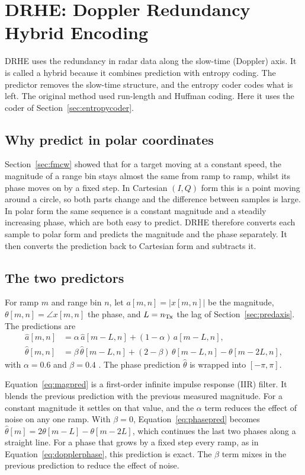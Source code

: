 \section{DRHE: Doppler Redundancy Hybrid Encoding}
\label{sec:drhe}

DRHE \cite{li2014,zivkovic2015} uses the redundancy in radar data along the
slow-time (Doppler) axis. It is called a hybrid because it combines prediction
with entropy coding. The predictor removes the slow-time structure, and the
entropy coder codes what is left. The original method used run-length and
Huffman coding. Here it uses the coder of Section~\ref{sec:entropycoder}.

\subsection{Why predict in polar coordinates}

Section~\ref{sec:fmcw} showed that for a target moving at a constant speed, the
magnitude of a range bin stays almost the same from ramp to ramp, whilst its
phase moves on by a fixed step. In Cartesian $(I,Q)$ form this is a point
moving around a circle, so both parts change and the difference between
samples is large. In polar form the same sequence is a constant magnitude and a
steadily increasing phase, which are both easy to predict. DRHE therefore
converts each sample to polar form and predicts the magnitude and the phase
separately. It then converts the prediction back to Cartesian form and
subtracts it.

\subsection{The two predictors}

For ramp $m$ and range bin $n$, let $a[m,n] = |x[m,n]|$ be the magnitude,
$\theta[m,n] = \angle x[m,n]$ the phase, and $L = n_{\mathrm{Tx}}$ the lag of
Section~\ref{sec:predaxis}. The predictions are
\begin{align}
\label{eq:magpred}
\hat{a}[m,n] &= \alpha\,\hat{a}[m-L,n] + (1-\alpha)\,a[m-L,n],\\[3pt]
\label{eq:phasepred}
\hat{\theta}[m,n] &= \beta\,\hat{\theta}[m-L,n]
   + (2-\beta)\,\theta[m-L,n] - \theta[m-2L,n],
\end{align}
with $\alpha = 0.6$ and $\beta = 0.4$ \cite[Table~4.4]{kiem2025}. The phase
prediction $\hat{\theta}$ is wrapped into $[-\pi, \pi]$.

Equation~\eqref{eq:magpred} is a first-order infinite impulse response (IIR)
filter. It blends the previous prediction with the previous measured
magnitude. For a constant magnitude it settles on that value, and the $\alpha$
term reduces the effect of noise on any one ramp. With $\beta = 0$,
Equation~\eqref{eq:phasepred} becomes
$\hat{\theta}[m] = 2\theta[m-L] - \theta[m-2L]$, which continues the last two
phases along a straight line. For a phase that grows by a fixed step every
ramp, as in Equation~\eqref{eq:dopplerphase}, this prediction is exact. The
$\beta$ term mixes in the previous prediction to reduce the effect of noise.

